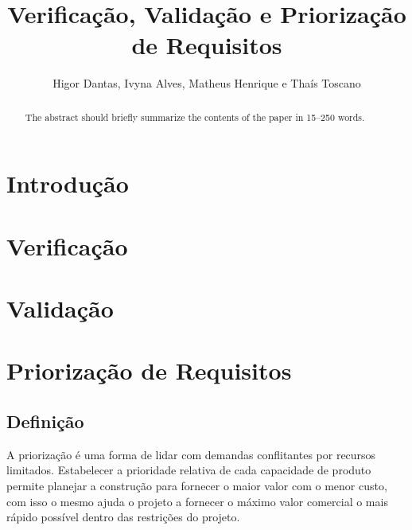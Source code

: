 \documentclass[runningheads]{llncs}
\begin{document}
%
\title{Verificação, Validação e Priorização de Requisitos}
%
\author{Higor Dantas,
Ivyna Alves, Matheus Henrique e
Thaís Toscano}
%
%
%
\maketitle              %
%
\begin{abstract}
The abstract should briefly summarize the contents of the paper in
15--250 words.

\end{abstract}
%
%
%
\section{Introdução}

\section{Verificação}

\section{Validação}

\section{Priorização de Requisitos}

\subsection{Definição}
A priorização é uma forma de lidar com demandas conflitantes por recursos limitados. Estabelecer a prioridade relativa de cada capacidade de produto permite planejar a construção para fornecer o maior valor com o menor custo, com isso o mesmo ajuda o projeto a fornecer o máximo valor comercial o mais rápido possível dentro das restrições do projeto.
\end{document}
